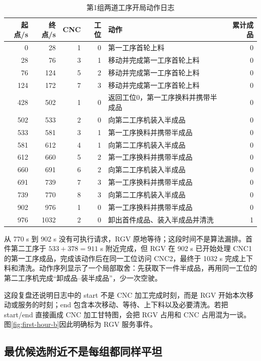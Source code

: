 \documentclass[UTF8,11pt,a4paper]{ctexart}
\begin{document}
\begin{table}[H]
\centering
\caption{第1组两道工序开局动作日志}
\label{tab:first-actions-b}
\scriptsize
\begin{tabular}{rrrrp{5.8cm}r}
\toprule
起点/s & 终点/s & CNC & 工位 & 动作 & 累计成品\\
\midrule
0 & 28 & 1 & 0 & 第一工序首轮上料 & 0\\
28 & 76 & 3 & 1 & 移动并完成第一工序首轮上料 & 0\\
76 & 124 & 5 & 2 & 移动并完成第一工序首轮上料 & 0\\
124 & 172 & 7 & 3 & 移动并完成第一工序首轮上料 & 0\\
428 & 502 & 1 & 0 & 返回工位0，第一工序换料并携带半成品 & 0\\
502 & 533 & 2 & 0 & 向第二工序机装入半成品 & 0\\
533 & 581 & 3 & 1 & 第一工序换料并携带半成品 & 0\\
581 & 612 & 4 & 1 & 向第二工序机装入半成品 & 0\\
612 & 660 & 5 & 2 & 第一工序换料并携带半成品 & 0\\
660 & 691 & 6 & 2 & 向第二工序机装入半成品 & 0\\
691 & 739 & 7 & 3 & 第一工序换料并携带半成品 & 0\\
739 & 770 & 8 & 3 & 向第二工序机装入半成品 & 0\\
902 & 976 & 1 & 0 & 第一工序换料并携带半成品 & 0\\
976 & 1032 & 2 & 0 & 卸出首件成品、装入半成品并清洗 & 1\\
\bottomrule
\end{tabular}
\end{table}

从 770 s 到 902 s 没有可执行请求，RGV 原地等待；这段时间不是算法漏排。首件第二工序于 $533+378=911$ s 附近完成，但 RGV 在 902 s 已开始处理 CNC1 的第一工序成品，完成该动作后在同一工位访问 CNC2，最终于 1032 s 完成上下料和清洗。动作序列显示了一个局部取舍：先获取下一件半成品，再用同一工位的第二工序机完成“卸成品--装半成品”，少一次空驶。

这段复盘还说明日志中的 start 不是 CNC 加工完成时刻，而是 RGV 开始本次移动或服务的时刻；end 包含本次移动、等待、上下料以及必要清洗。若把 start/end 直接画成 CNC 加工甘特图，会把 RGV 占用和 CNC 占用混为一谈。图\ref{fig:first-hour-b}因此明确标为 RGV 服务事件。

\subsection{最优候选附近不是每组都同样平坦}
\end{document}

